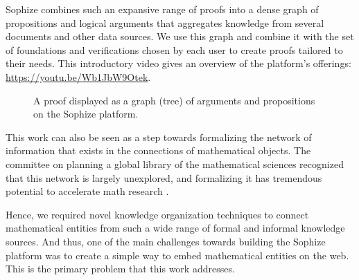 \documentclass[a4paper]{article}
\begin{document}
Sophize combines such an expansive range of proofs into a dense graph of propositions and logical arguments that aggregates knowledge from several documents and other data sources. We use this graph and combine it with the set of foundations and verifications chosen by each user to create proofs tailored to their needs. This introductory video gives an overview of the platform's offerings: \url{https://youtu.be/Wb1JbW9Otek}.

\begin{figure}[ht]
\begin{center}
\caption{A proof displayed as a graph (tree) of arguments and propositions on the Sophize platform.}
\label{proof_tree}
\end{center}
\end{figure}

This work can also be seen as a step towards formalizing the network of information that exists in the connections of mathematical objects. The committee on planning a global library of the mathematical sciences recognized that this network is largely unexplored, and formalizing it has tremendous potential to accelerate math research \cite{sciences2014developing}.

Hence, we required novel knowledge organization techniques to connect mathematical entities from such a wide range of formal and informal knowledge sources. And thus, one of the main challenges towards building the Sophize platform was to create a simple way to embed mathematical entities on the web. This is the primary problem that this work addresses.
\end{document}
